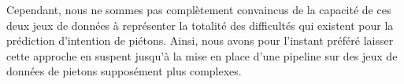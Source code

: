 Cependant, nous ne sommes pas complètement convaincus de la capacité de ces deux jeux de données à représenter la totalité des difficultés qui existent pour la prédiction d'intention de piétons. Ainsi, nous avons pour l'instant préféré laisser cette approche en suspent jusqu'à la mise en place d'une pipeline sur des jeux de données de pietons supposément plus complexes.
